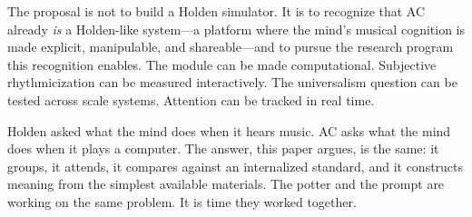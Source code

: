 \documentclass[10pt,letterpaper,twocolumn]{article}
\begin{document}
The proposal is not to build a Holden simulator. It is to recognize that AC already \emph{is} a Holden-like system---a platform where the mind's musical cognition is made explicit, manipulable, and shareable---and to pursue the research program this recognition enables. The module can be made computational. Subjective rhythmicization can be measured interactively. The universalism question can be tested across scale systems. Attention can be tracked in real time.

Holden asked what the mind does when it hears music. AC asks what the mind does when it plays a computer. The answer, this paper argues, is the same: it groups, it attends, it compares against an internalized standard, and it constructs meaning from the simplest available materials. The potter and the prompt are working on the same problem. It is time they worked together.



\end{document}

